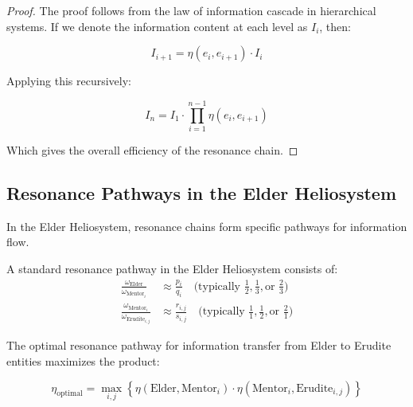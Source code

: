 \begin{proof}
The proof follows from the law of information cascade in hierarchical systems. If we denote the information content at each level as $I_i$, then:

\begin{equation}
I_{i+1} = \eta(e_i, e_{i+1}) \cdot I_i
\end{equation}

Applying this recursively:

\begin{equation}
I_n = I_1 \cdot \prod_{i=1}^{n-1} \eta(e_i, e_{i+1})
\end{equation}

Which gives the overall efficiency of the resonance chain.
\end{proof}

\subsection{Resonance Pathways in the Elder Heliosystem}

In the Elder Heliosystem, resonance chains form specific pathways for information flow.

\begin{definition}
A standard resonance pathway in the Elder Heliosystem consists of:
\begin{align}
\frac{\omega_{\text{Elder}}}{\omega_{\text{Mentor}_i}} &\approx \frac{p_i}{q_i} \quad \text{(typically } \frac{1}{2}, \frac{1}{3}, \text{or } \frac{2}{3}\text{)} \\
\frac{\omega_{\text{Mentor}_i}}{\omega_{\text{Erudite}_{i,j}}} &\approx \frac{r_{i,j}}{s_{i,j}} \quad \text{(typically } \frac{1}{1}, \frac{1}{2}, \text{or } \frac{2}{1}\text{)}
\end{align}
\end{definition}

\begin{theorem}
The optimal resonance pathway for information transfer from Elder to Erudite entities maximizes the product:

\begin{equation}
\eta_{\text{optimal}} = \max_{i,j} \left\{ \eta(\text{Elder}, \text{Mentor}_i) \cdot \eta(\text{Mentor}_i, \text{Erudite}_{i,j}) \right\}
\end{equation}
\end{theorem}

